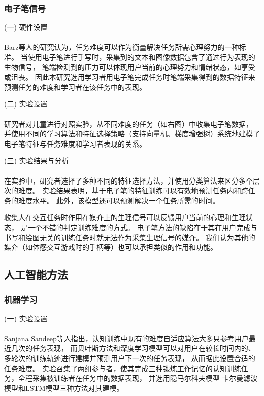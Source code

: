 \documentclass{article}
\begin{document}
            \subsubsection{电子笔信号}
            (一) 硬件设置\paragraph{}
            Barz等人的研究认为，任务难度可以作为衡量解决任务所需心理努力的一种标准。
            当使用电子笔进行手写时，采集到的文本和图像数据包含了通过行为表现的生物信号，
            笔端检测到的压力可以体现用户当前的心理努力和情绪状态，如享受或沮丧。
            因此本研究选用学习者用电子笔完成任务时笔端采集得到的数据特征来预测任务的难度和学习者在该任务中的表现。

            (二) 实验设置\paragraph{}
            研究者对儿童进行对照实验，从不同难度的任务（如右图）中收集电子笔数据，
            并使用不同的学习算法和特征选择策略（支持向量机、梯度增强树）系统地建模了电子笔特征与任务难度和学习者表现的关系。

            (三) 实验结果与分析\paragraph{}
            在实验中，研究者选择了多种不同的特征选择方法，并使用分类算法来区分多个层次的难度。
            实验结果表明，基于电子笔的特征训练可以有效地预测任务内和跨任务的难度水平。
            此外，该模型还可以预测解决一个任务所需的时间。

            收集人在交互任务时作用在媒介上的生理信号可以反馈用户当前的心理和生理状态，
            是一个不错的判定训练难度的方式。
            电子笔方法的缺陷在于其在用户完成与书写和绘图无关的训练任务时就无法作为采集生理信号的媒介。
            我们认为其他的媒介（如体感交互游戏时的手柄等）也可以承担类似的作用和功能。


            
        \subsection{人工智能方法}
            \subsubsection{机器学习}
            (一) 实验设置\paragraph{}
            Sanjana Sandeep等人指出，认知训练中现有的难度自适应算法大多只参考用户最近几次的任务表现，
            而贝叶斯方法和深度学习模型可以对用户在较长时间内的、多轮次的训练轨迹进行建模并预测用户下一次的任务表现，
            从而据此设置合适的任务难度。
            实验召集了两组参与者，使其完成三种锻炼工作记忆的认知训练任务，全程采集被训练者在任务中的数据表现，
            并选用隐马尔科夫模型 卡尔曼滤波模型和LSTM模型三种方法对其建模。
\end{document}
